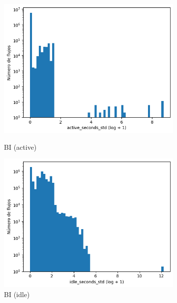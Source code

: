 \begin{figure}[H]
    \hfill
    \begin{subfigure}[b]{0.26\textwidth}
        \centering
        \includegraphics[width=\linewidth]{media/packet_pincer_botiot/active_seconds_std_log_x_log_y.png}
        \caption{BI (active)}
        \includegraphics[width=\linewidth]{media/packet_pincer_botiot/idle_seconds_std_log_x_log_y.png}
        \caption{BI (idle)}
    \end{subfigure}
    \hfill
    \begin{subfigure}[b]{0.26\textwidth}
        \centering

\end{subfigure}
\end{figure}
